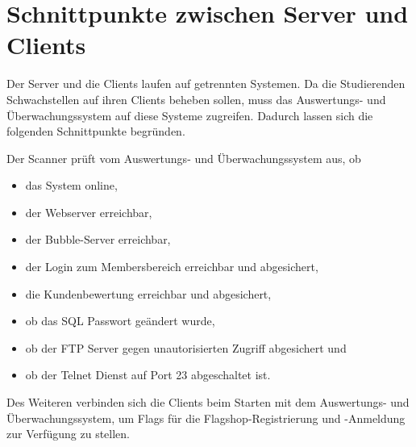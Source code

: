 \section{Schnittpunkte zwischen Server und Clients}
\label{sec:Schnittpunkte_zwischen_Server_und_Clients}

Der Server und die Clients laufen auf getrennten Systemen. Da die Studierenden Schwachstellen auf ihren Clients beheben sollen, muss das Auswertungs- und Überwachungssystem auf diese Systeme zugreifen. Dadurch lassen sich die folgenden Schnittpunkte begründen.

Der Scanner prüft vom Auswertungs- und Überwachungssystem aus, ob 
\begin{itemize}
	\item das System online,
	\item der Webserver erreichbar,
	\item der Bubble-Server erreichbar,
	\item der Login zum Membersbereich erreichbar und abgesichert,
	\item die Kundenbewertung erreichbar und abgesichert,
	\item ob das SQL Passwort geändert wurde,
	\item ob der FTP Server gegen unautorisierten Zugriff abgesichert und
	\item ob der Telnet Dienst auf Port 23 abgeschaltet ist. 
\end{itemize}

Des Weiteren verbinden sich die Clients beim Starten mit dem Auswertungs- und Überwachungssystem, um Flags für die Flagshop-Registrierung und -Anmeldung zur Verfügung zu stellen.